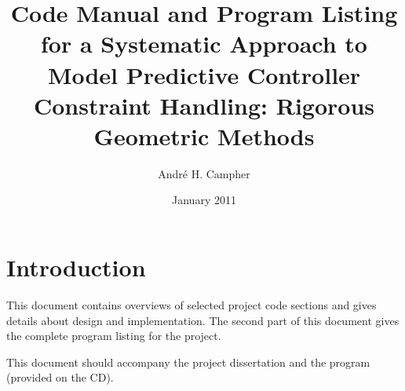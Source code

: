 \documentclass[a4paper,12pt,pdftex]{article}
\title{Code Manual and Program Listing for a Systematic Approach to Model Predictive Controller Constraint 
  Handling: Rigorous Geometric Methods}
\author{Andr\'e H. Campher}
\date{January 2011}
\begin{document}
\maketitle
\bigskip
\tableofcontents

\newpage

\section{Introduction}
This document contains overviews of selected project code sections and gives details about design and implementation.
The second part of this document gives the complete program listing for the project.

This document should accompany the project dissertation and the program (provided on the CD).





\end{document}
